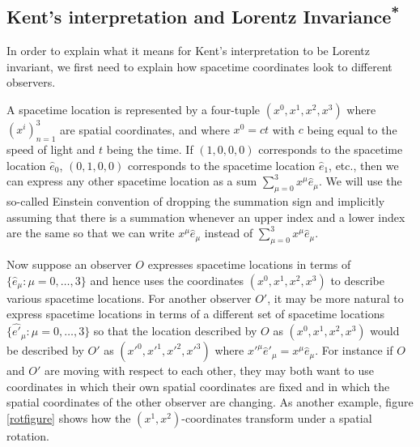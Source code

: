 \subsection{Kent's interpretation and Lorentz Invariance\label{LorentzInvariance}\textsuperscript{*}}
In order to explain what it means for Kent's interpretation to be Lorentz invariant, we first need to explain how spacetime coordinates look to different observers. 

A spacetime location is represented by a four-tuple $(x^0, x^1, x^2, x^3)$ where $(x^i)_{n=1}^3$ are spatial coordinates, and where $x^0=ct$ with $c$ being equal to the speed of light and $t$ being the time. If $(1,0,0,0)$ corresponds to the spacetime location $\hat{e}_0$, $(0,1,0,0)$ corresponds to the spacetime location $\hat{e}_1$, etc., then we can express any other spacetime location  as a sum $\sum_{\mu=0}^3x^\mu\hat{e}_\mu$. We will use the so-called Einstein convention of dropping the summation sign and implicitly assuming that there is a summation whenever an upper index and a lower index are the same so that we can write $x^\mu\hat{e}_\mu$ instead of $\sum_{\mu=0}^3x^\mu\hat{e}_\mu$.  

Now suppose an observer $O$ expresses spacetime locations in terms of $\{\hat{e}_\mu:\mu=0,\ldots,3\}$ and hence uses the coordinates $(x^0, x^1, x^2, x^3)$ to describe various spacetime locations. For another observer $O'$, it may be more natural to express spacetime locations in terms of a different set of spacetime locations $\{\hat{e'}_\mu:\mu=0,\ldots,3\}$ so that the location described by $O$ as $(x^0, x^1, x^2, x^3)$ would be described by $O'$ as $({x'}^0, {x'}^1, {x'}^2, {x'}^3)$ where ${x'}^\mu{\hat{e}'}_\mu=x^\mu\hat{e}_\mu$.  For instance if $O$ and $O'$ are moving with respect to each other, they may both want to use coordinates in which their own spatial coordinates are fixed and in which the spatial coordinates of the other observer are changing. As another example, figure \ref{rotfigure} shows how the $(x^1, x^2)$-coordinates transform under a spatial rotation. 


